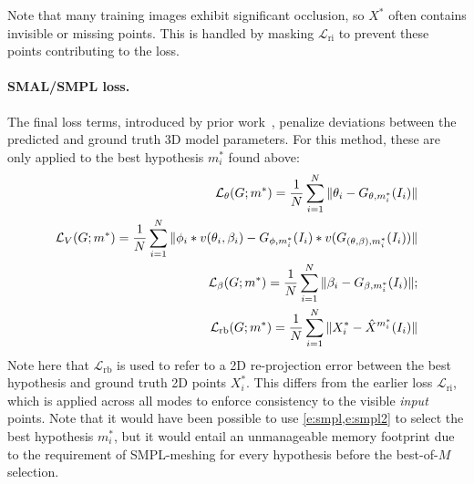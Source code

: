 Note that many training images exhibit significant occlusion, so $X^*$ often contains invisible or missing points. This is handled by masking $\mathcal{L}_\text{ri}$ to prevent these points contributing to the loss.

\paragraph{SMAL/SMPL loss.}
The final loss terms, introduced by prior work~\cite{kanazawa18end-to-end,pavlakos18learning,kolotouros19learning}, penalize
deviations between the predicted and ground truth 3D model parameters.
For this method, these are only applied to the best hypothesis $m_i^*$ found above:
{\small
\begin{align}
\mathcal{L}_\theta(G;m^*) = \frac{1}{N}
  \sum_{i=1}^N \| \theta_i - G_{\theta,m_i^*}(I_i)\| \\
\mathcal{L}_V(G;m^*) = \frac{1}{N} \label{e:smpl}
  \sum_{i=1}^N \| \phi_i * v(\theta_i, \beta_i) - G_{\phi,m_i^*}(I_i)*v(G_{(\theta,\beta),m_i^*}(I_i))\| \\
\mathcal{L}_\beta(G;m^*) = \frac{1}{N}
  \sum_{i=1}^N \| \beta_i - G_{\beta,m_i^*}(I_i)\|; \\
\mathcal{L}_\text{rb}(G;m^*) = \frac{1}{N} \label{e:smpl2}
  \sum_{i=1}^N \| X^*_i - \hat{X}^{m_i^*}(I_i)\|
\end{align}}%
Note here that $\mathcal{L}_\text{rb}$ is used to refer to a 2D re-projection error between the best hypothesis and ground truth 2D points $X^*_i$. This differs from the earlier loss $\mathcal{L}_\text{ri}$, which is applied across all modes to enforce consistency to the visible \emph{input} points. Note that it would have been possible to use \cref{e:smpl,e:smpl2} to select the best hypothesis $m_i^*$, but it would entail an unmanageable memory footprint due to the requirement of SMPL-meshing for every hypothesis before the best-of-$M$ selection. 

